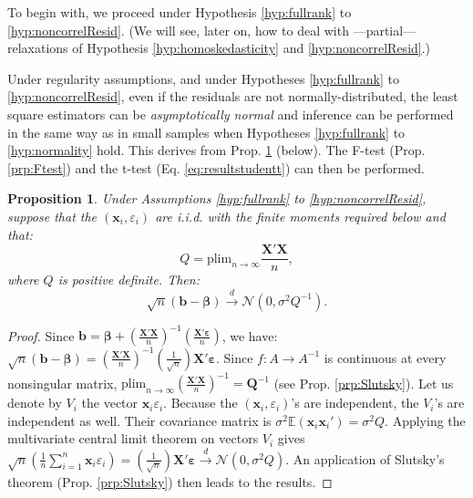 \documentclass[
  11pt,
]{book}
\newtheorem{proposition}{Proposition}[chapter]
\theoremstyle{definition}
\theoremstyle{definition}
\theoremstyle{definition}
\theoremstyle{definition}
\theoremstyle{remark}
\begin{document}
To begin with, we proceed under Hypothesis \ref{hyp:fullrank} to \ref{hyp:noncorrelResid}. (We will see, later on, how to deal with ---partial--- relaxations of Hypothesis \ref{hyp:homoskedasticity} and \ref{hyp:noncorrelResid}.)

Under regularity assumptions, and under Hypotheses \ref{hyp:fullrank} to \ref{hyp:noncorrelResid}, even if the residuals are not normally-distributed, the least square estimators can be \emph{asymptotically normal} and inference can be performed in the same way as in small samples when Hypotheses \ref{hyp:fullrank} to \ref{hyp:normality} hold. This derives from Prop. \ref{prp:asymptOLS} (below). The F-test (Prop. \ref{prp:Ftest}) and the t-test (Eq. \eqref{eq:resultstudentt}) can then be performed.

\begin{proposition}
\protect\hypertarget{prp:asymptOLS}{}\label{prp:asymptOLS}Under Assumptions \ref{hyp:fullrank} to \ref{hyp:noncorrelResid}, suppose that the \((\mathbf{x}_i,\varepsilon_i)\) are i.i.d. with the finite moments required below and that:
\begin{equation}
Q = \mbox{plim}_{n \rightarrow \infty} \frac{\mathbf{X}'\mathbf{X}}{n},\label{eq:Qasympt}
\end{equation}
where \(Q\) is positive definite. Then:
\begin{equation}
\sqrt{n}(\mathbf{b} - \boldsymbol\beta)\overset{d} {\rightarrow} \mathcal{N}\left(0,\sigma^2Q^{-1}\right).\label{eq:convgceOLS}
\end{equation}
\end{proposition}

\begin{proof}
Since \(\mathbf{b} = \boldsymbol\beta + \left( \frac{\mathbf{X}'\mathbf{X}}{n}\right)^{-1}\left(\frac{\mathbf{X}'\boldsymbol\varepsilon}{n}\right)\), we have: \(\sqrt{n}(\mathbf{b} - \boldsymbol\beta) = \left( \frac{\mathbf{X}'\mathbf{X}}{n}\right)^{-1} \left(\frac{1}{\sqrt{n}}\right)\mathbf{X}'\boldsymbol\varepsilon\). Since \(f:A \rightarrow A^{-1}\) is continuous at every nonsingular matrix, \(\mbox{plim}_{n \rightarrow \infty} \left(\frac{\mathbf{X}'\mathbf{X}}{n}\right)^{-1} = \mathbf{Q}^{-1}\) (see Prop. \ref{prp:Slutsky}). Let us denote by \(V_i\) the vector \(\mathbf{x}_i \varepsilon_i\). Because the \((\mathbf{x}_i,\varepsilon_i)\)'s are independent, the \(V_i\)'s are independent as well. Their covariance matrix is \(\sigma^2\mathbb{E}(\mathbf{x}_i \mathbf{x}_i')=\sigma^2Q\). Applying the multivariate central limit theorem on vectors \(V_i\) gives \(\sqrt{n}\left(\frac{1}{n}\sum_{i=1}^n \mathbf{x}_i \varepsilon_i\right) = \left(\frac{1}{\sqrt{n}}\right)\mathbf{X}'\boldsymbol\varepsilon \overset{d}{\rightarrow} \mathcal{N}(0,\sigma^2Q)\). An application of Slutsky's theorem (Prop. \ref{prp:Slutsky}) then leads to the results.
\end{proof}
\end{document}
